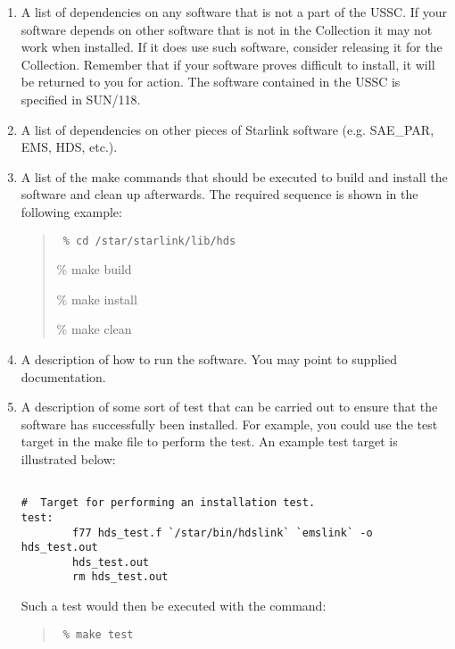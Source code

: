 \begin{enumerate}
\begin{itemize}
\end{itemize}

Full details of the usage and structure of Starlink make files (including an
annotated example make file for packages) can be found in SSN/66.

\item A list of dependencies on any software that is not a part
of the USSC. 
If your software depends on other software that is not in the Collection it
may not work when installed.
If it does use such software, consider releasing it for the Collection.
Remember that if your software proves difficult to install, it will be returned
to you for action.
The software contained in the USSC is specified in SUN/118.

\item A list of dependencies on other pieces of Starlink software (e.g.
SAE\_PAR, EMS, HDS, etc.).

\item A list of the make commands that should be executed to build and install
the software and clean up afterwards. The required sequence is shown in the
following example:

\begin{quote}
{\tt
\% cd /star/starlink/lib/hds

\% make build

\% make install

\% make clean
}
\end{quote}

\item A description of how to run the software. You may point to supplied
documentation.

\item A description of some sort of test that can be carried out to ensure
that the software has successfully been installed. For example, you could
use the test target in the make file to perform the test. An example 
test target is illustrated below:

\begin{verbatim}

#  Target for performing an installation test.
test:
        f77 hds_test.f `/star/bin/hdslink` `emslink` -o hds_test.out
        hds_test.out
        rm hds_test.out

\end{verbatim}


Such a test would then be executed with the command:

\begin{quote}
{\tt
\% make test
}
\end{quote}


\end{enumerate}
